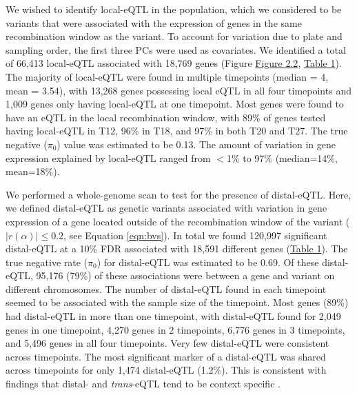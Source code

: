 \documentclass[article,9pt,twocolumn,twoside]{rilabRxiv}
\begin{document}
We wished to identify local-eQTL in the population, which we considered to be variants that were associated with the expression of genes in the same recombination window as the variant.
To account for variation due to plate and sampling order, the first three PCs were used as covariates.
We identified a total of 66,413 local-eQTL associated with 18,769 genes (Figure \hyperref[fig:cistransfigure]{Figure 2.2}, \hyperref[tab:eqtltable]{Table 1}).
The majority of local-eQTL were found in multiple timepoints (median = 4, mean = 3.54), with 13,268 genes possessing local eQTL in all four timepoints and 1,009 genes only having local-eQTL at one timepoint.
Most genes were found to have an eQTL in the local recombination window, with 89\% of genes tested having local-eQTL in T12, 96\% in T18, and 97\% in both T20 and T27.
The true negative ($\pi_0$) value was estimated to be 0.13.
The amount of variation in gene expression explained by local-eQTL ranged from $<$1\% to 97\% (median=14\%, mean=18\%).
\par
We performed a whole-genome scan to test for the presence of distal-eQTL.
Here, we defined distal-eQTL as genetic variants associated with variation in gene expression of a gene located outside of the recombination window of the variant ($|r(\alpha)| \le 0.2$, see Equation \ref{eqn:bvs}).
In total we found 120,997 significant distal-eQTL at a 10\% FDR associated with 18,591 different genes (\hyperref[tab:eqtltable]{Table 1}).
The true negative rate ($\pi_0$) for distal-eQTL was estimated to be 0.69.
Of these distal-eQTL, 95,176 (79\%) of these associations were between a gene and variant on different chromosomes.
The number of distal-eQTL found in each timepoint seemed to be associated with the sample size of the timepoint.
Most genes (89\%) had distal-eQTL in more than one timepoint, with distal-eQTL found for 2,049 genes in one timepoint, 4,270 genes in 2 timepoints, 6,776 genes in 3 timepoints, and 5,496 genes in all four timepoints.
Very few distal-eQTL were consistent across timepoints.
The most significant  marker of a distal-eQTL was shared across timepoints for only 1,474 distal-eQTL (1.2\%).
This is consistent with findings that distal- and \textit{trans}-eQTL tend to be context specific \citep{Snoek,Mu,Vosa,vanNas}.
\end{document}
